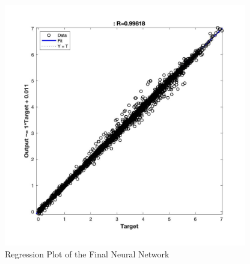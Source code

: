 \documentclass{article}
\begin{document}
\begin{figure}[!h]
\center
  \includegraphics[width=300pt]{img/regression.jpg}
  \caption{Regression Plot of the Final Neural Network}
  \label{fig:regression}
\end{figure}
\end{document}
